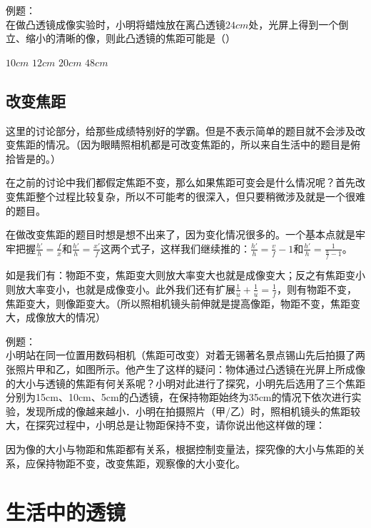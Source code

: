 \documentclass[12pt]{exam}
\begin{document}
例题：\\
在做凸透镜成像实验时，小明将蜡烛放在离凸透镜$24cm$处，光屏上得到一个倒立、缩小的清晰的像，则此凸透镜的焦距可能是（\answerline*[A]）

\begin{oneparchoices}
\choice $10cm$
\choice $12cm$
\choice $20cm$
\choice $48cm$
\end{oneparchoices}


\subsection{改变焦距}
这里的讨论部分，给那些成绩特别好的学霸。但是不表示简单的题目就不会涉及改变焦距的情况。（因为眼睛照相机都是可改变焦距的，所以来自生活中的题目是俯拾皆是的。）

在之前的讨论中我们都假定焦距不变，那么如果焦距可变会是什么情况呢？首先改变焦距整个过程比较复杂，所以不可能考的很深入，但只要稍微涉及就是一个很难的题目。

在做改变焦距的题目时想是想不出来了，因为变化情况很多的。一个基本点就是牢牢把握$\frac{h'}{h}=\frac{f}{x}$和$\frac{h'}{h}=\frac{x'}{f}$这两个式子，这样我们继续推的：$\frac{h'}{h}=\frac{v}{f}-1$和$\frac{h'}{h}=\frac{1}{\frac{u}{f}-1}$。

如是我们有：物距不变，焦距变大则放大率变大也就是成像变大；反之有焦距变小则放大率变小，也就是成像变小。此外我们还有扩展$\frac{1}{u}+\frac{1}{u}=\frac{1}{f}$，则有物距不变，焦距变大，则像距变大。（所以照相机镜头前伸就是提高像距，物距不变，焦距变大，成像放大的情况）

例题：\\
小明站在同一位置用数码相机（焦距可改变）对着无锡著名景点锡山先后拍摄了两张照片甲和乙，如图所示。他产生了这样的疑问：物体通过凸透镜在光屏上所成像的大小与透镜的焦距有何关系呢？小明对此进行了探究，小明先后选用了三个焦距分别为15cm、10cm、5cm的凸透镜，在保持物距始终为35cm的情况下依次进行实验，发现所成的像越来越小．小明在拍摄照片\answerline*[乙]（甲/乙）时，照相机镜头的焦距较大，在探究过程中，小明总是让物距保持不变，请你说出他这样做的理：

\begin{solutionorbox}[6ex]
因为像的大小与物距和焦距都有关系，根据控制变量法，探究像的大小与焦距的关系，应保持物距不变，改变焦距，观察像的大小变化。
\end{solutionorbox}



\section{生活中的透镜}
\end{document}
